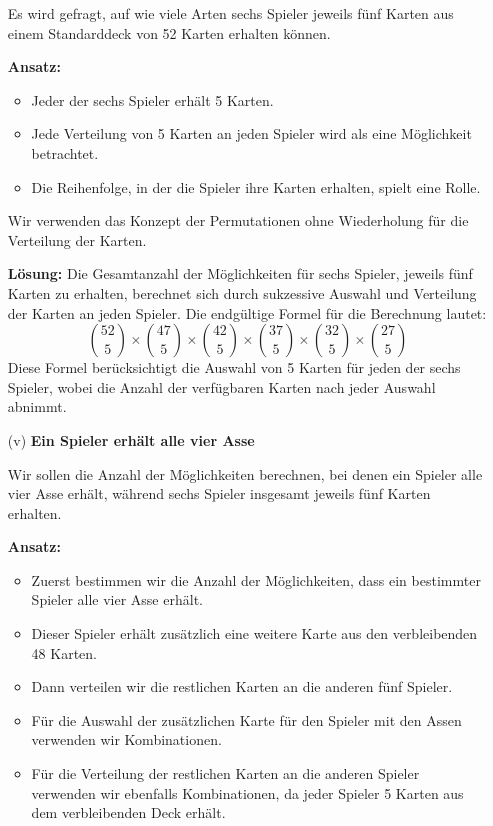 \documentclass{article}
\begin{document}
\begin{enumerate}
		Es wird gefragt, auf wie viele Arten sechs Spieler jeweils fünf Karten aus einem Standarddeck von 52 Karten erhalten können.

		\textbf{Ansatz:}
		\begin{itemize}
			\item Jeder der sechs Spieler erhält 5 Karten.
			\item Jede Verteilung von 5 Karten an jeden Spieler wird als eine Möglichkeit betrachtet.
			\item Die Reihenfolge, in der die Spieler ihre Karten erhalten, spielt eine Rolle.
		\end{itemize}
		Wir verwenden das Konzept der Permutationen ohne Wiederholung für die Verteilung der Karten.

		\textbf{Lösung:}
		Die Gesamtanzahl der Möglichkeiten für sechs Spieler, jeweils fünf Karten zu erhalten, berechnet sich durch sukzessive Auswahl und Verteilung der Karten an jeden Spieler. Die endgültige Formel für die Berechnung lautet:
		\[
			\binom{52}{5} \times \binom{47}{5} \times \binom{42}{5} \times \binom{37}{5} \times \binom{32}{5} \times \binom{27}{5}
		\]
		Diese Formel berücksichtigt die Auswahl von 5 Karten für jeden der sechs Spieler, wobei die Anzahl der verfügbaren Karten nach jeder Auswahl abnimmt.
	\item[(v)] \textbf{Ein Spieler erhält alle vier Asse}

		Wir sollen die Anzahl der Möglichkeiten berechnen, bei denen ein Spieler alle vier Asse erhält, während sechs Spieler insgesamt jeweils fünf Karten erhalten.

		\textbf{Ansatz:}
		\begin{itemize}
			\item Zuerst bestimmen wir die Anzahl der Möglichkeiten, dass ein bestimmter Spieler alle vier Asse erhält.
			\item Dieser Spieler erhält zusätzlich eine weitere Karte aus den verbleibenden 48 Karten.
			\item Dann verteilen wir die restlichen Karten an die anderen fünf Spieler.
			\item Für die Auswahl der zusätzlichen Karte für den Spieler mit den Assen verwenden wir Kombinationen.
			\item Für die Verteilung der restlichen Karten an die anderen Spieler verwenden wir ebenfalls Kombinationen, da jeder Spieler 5 Karten aus dem verbleibenden Deck erhält.
		\end{itemize}


\end{enumerate}
\end{document}
